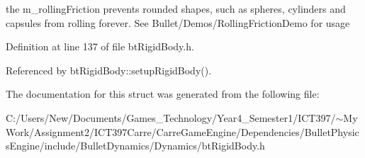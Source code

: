 the m\_\-rollingFriction prevents rounded shapes, such as spheres, cylinders and capsules from rolling forever. See Bullet/Demos/RollingFrictionDemo for usage 

Definition at line 137 of file btRigidBody.h.

Referenced by btRigidBody::setupRigidBody().

The documentation for this struct was generated from the following file:\begin{CompactItemize}
\item 
C:/Users/New/Documents/Games\_\-Technology/Year4\_\-Semester1/ICT397/$\sim$My Work/Assignment2/ICT397Carre/CarreGameEngine/Dependencies/BulletPhysicsEngine/include/BulletDynamics/Dynamics/btRigidBody.h\end{CompactItemize}
